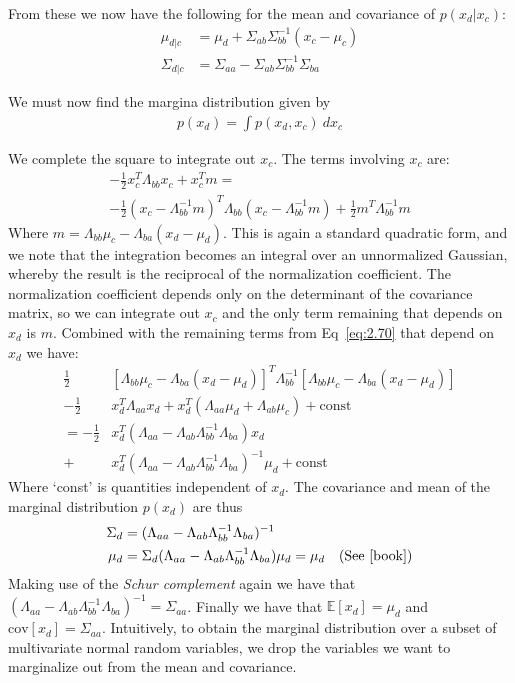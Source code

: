 From these we now have the following for the mean and covariance of $p(x_d|x_c)$:
\begin{align}
	\mu_{d|c} &= \mu_d + \Sigma_{ab} \Sigma_{bb}^{-1} (x_c - \mu_c) \\
	\Sigma_{d|c} &= \Sigma_{aa} - \Sigma_{ab} \Sigma_{bb}^{-1} \Sigma_{ba}
\end{align}

We must now find the margina distribution given by
\begin{align*}
	p(x_d) = \int p(x_d, x_c) \ dx_c
\end{align*}

We complete the square to integrate out $x_c$. The terms involving $x_c$ are:
\begin{align*}
	-\frac{1}{2} x_c^T \Lambda_{bb} x_c + x_c^T m = \\
	-\frac{1}{2} (x_c - \Lambda_{bb}^{-1} m)^T \Lambda_{bb} (x_c - \Lambda_{bb}^{-1} m)
	+\frac{1}{2} m^T \Lambda_{bb}^{-1} m
\end{align*}
Where $m = \Lambda_{bb} \mu_c - \Lambda_{ba} (x_d - \mu_d)$. This is again a
standard quadratic form, and we note that the integration becomes an integral
over an unnormalized Gaussian, whereby the result is the reciprocal of the
normalization coefficient\cite[p. 88]{book}. The normalization coefficient
depends only on the determinant of the covariance matrix, so we can integrate
out $x_c$ and the only term remaining that depends on $x_d$ is $m$. Combined
with the remaining terms from Eq~\ref{eq:2.70} that depend on $x_d$ we have:
\begin{align*}
	\frac{1}{2} & [ \Lambda_{bb} \mu_c - \Lambda_{ba} (x_d - \mu_d)]^T \Lambda_{bb}^{-1} [\Lambda_{bb} \mu_c - \Lambda_{ba}(x_d - \mu_d)] \\
	-\frac{1}{2} & x_d^T \Lambda_{aa} x_d + x_d^T (\Lambda_{aa} \mu_d + \Lambda_{ab} \mu_c) + \text{const} \\
	= -\frac{1}{2} & x_d^T(\Lambda_{aa} - \Lambda_{ab} \Lambda_{bb}^{-1} \Lambda_{ba}) x_d \\
	+ & x_d^T (\Lambda_{aa} - \Lambda_{ab} \Lambda_{bb}^{-1} \Lambda_{ba})^{-1} \mu_d + \text{const}
\end{align*}
Where `const' is quantities independent of $x_d$. The covariance and mean of the
marginal distribution $p(x_d)$ are thus
\begin{align*}
	\Sigma_d &= (\Lambda_{aa} - \Lambda_{ab} \Lambda_{bb}^{-1} \Lambda_{ba})^{-1} \\
	\mu_d &= \Sigma_d (\Lambda_{aa} - \Lambda_{ab} \Lambda_{bb}^{-1} \Lambda_{ba}) \mu_d = \mu_d \quad \text{(See \cite[p.89,Eq~2.89]{book})}
\end{align*}
Making use of the \textit{Schur complement} again we have that $(\Lambda_{aa} -
\Lambda_{ab} \Lambda_{bb}^{-1} \Lambda_{ba})^{-1} = \Sigma_{aa}$. Finally we
have that $\mathbb{E}[x_d] = \mu_d$ and $\text{cov}[x_d] =
\Sigma_{aa}$. Intuitively, to obtain the marginal distribution over a subset of
multivariate normal random variables, we drop the variables we want to
marginalize out from the mean and covariance.

